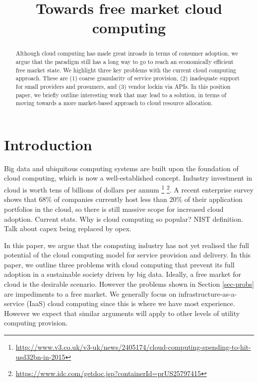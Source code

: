 \documentclass[conference,10pt]{IEEEtran}
\begin{document}
\title{Towards free market cloud computing}


\author{
}

\maketitle


\begin{abstract}
Although cloud computing has made great inroads in terms of consumer adoption, we argue that the paradigm still has a long way to go to reach an economically efficient free market state.
We highlight three key problems with the current cloud computing approach. These are (1) coarse granularity of service provision, (2) inadequate support for small providers and prosumers, and (3) vendor lockin via APIs.
In this position paper, we briefly outline interesting work that may lead to a solution, in terms of moving towards a more market-based approach to cloud resource allocation.
\end{abstract}


\section{Introduction}
\label{sec-intro}

Big data and ubiquitous computing systems are built upon the foundation of cloud computing, which is now a well-established concept. Industry investment in cloud is worth tens of billions of dollars per annum \footnote{
\url{http://www.v3.co.uk/v3-uk/news/2405174/cloud-computing-spending-to-hit-usd32bn-in-2015}} \footnote{\url{https://www.idc.com/getdoc.jsp?containerId=prUS25797415}}. 
A recent enterprise survey shows that 68\% of companies currently host less than 20\% of their application portfolios in the cloud, so there is still massive scope for increased cloud adoption.
Current stats. Why is cloud computing so popular? NIST definition. Talk about capex being replaced by opex.

In this paper, we argue that the computing industry has not yet realised the full potential of the cloud computing model for service provision and delivery. In this paper, we outline three problems with cloud computing that prevent its full adoption in a sustainable society driven by big data.
Ideally, a free market for cloud is the desirable scenario. However the problems shown in Section \ref{sec-probs}
are impediments to a free market.
We generally focus on infrastructure-as-a-service (IaaS) cloud computing since this is where we have most experience. However we expect that similar arguments will apply to other levels of utility computing provision.
\end{document}
